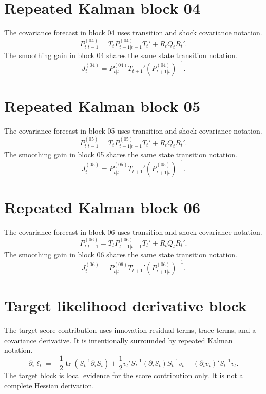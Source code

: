 \section{Repeated Kalman block 04}
The covariance forecast in block 04 uses transition and shock covariance notation.
\begin{equation}\label{eq:repeat-kalman-covariance-04}
P^{(04)}_{t|t-1} = T_t P^{(04)}_{t-1|t-1}T_t' + R_t Q_t R_t'.
\end{equation}
The smoothing gain in block 04 shares the same state transition notation.
\begin{equation}\label{eq:repeat-kalman-smoothing-04}
J^{(04)}_t = P^{(04)}_{t|t}T_{t+1}'(P^{(04)}_{t+1|t})^{-1}.
\end{equation}

\section{Repeated Kalman block 05}
The covariance forecast in block 05 uses transition and shock covariance notation.
\begin{equation}\label{eq:repeat-kalman-covariance-05}
P^{(05)}_{t|t-1} = T_t P^{(05)}_{t-1|t-1}T_t' + R_t Q_t R_t'.
\end{equation}
The smoothing gain in block 05 shares the same state transition notation.
\begin{equation}\label{eq:repeat-kalman-smoothing-05}
J^{(05)}_t = P^{(05)}_{t|t}T_{t+1}'(P^{(05)}_{t+1|t})^{-1}.
\end{equation}

\section{Repeated Kalman block 06}
The covariance forecast in block 06 uses transition and shock covariance notation.
\begin{equation}\label{eq:repeat-kalman-covariance-06}
P^{(06)}_{t|t-1} = T_t P^{(06)}_{t-1|t-1}T_t' + R_t Q_t R_t'.
\end{equation}
The smoothing gain in block 06 shares the same state transition notation.
\begin{equation}\label{eq:repeat-kalman-smoothing-06}
J^{(06)}_t = P^{(06)}_{t|t}T_{t+1}'(P^{(06)}_{t+1|t})^{-1}.
\end{equation}

\section{Target likelihood derivative block}
The target score contribution uses innovation residual terms, trace terms, and a covariance derivative. It is intentionally surrounded by repeated Kalman notation.
\begin{equation}\label{eq:repeat-kalman-target-score}
\partial_i \ell_t
= -\frac{1}{2}\operatorname{tr}(S_t^{-1}\partial_i S_t)
+ \frac{1}{2}v_t' S_t^{-1}(\partial_i S_t)S_t^{-1}v_t
- (\partial_i v_t)'S_t^{-1}v_t.
\end{equation}
The target block is local evidence for the score contribution only. It is not a complete Hessian derivation.

